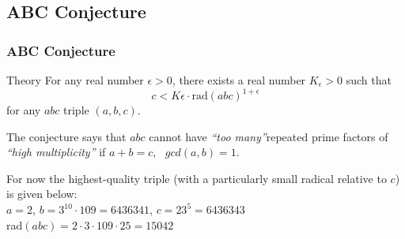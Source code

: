 \documentclass[9pt]{beamer}
\begin{document}
        \subsection{ABC Conjecture}
        \begin{frame}\label{abc}
            \frametitle{ABC Conjecture}
            \begin{block}{Theory}
                For any real number $\epsilon > 0$, there exists a real number $K_{\epsilon} > 0$ such that
                $$c < K\epsilon \cdot \text{rad}(abc)^{1+\epsilon}$$
                for any $abc$ triple $(a, b, c)$.
            \end{block}
            The conjecture says that $abc$ cannot have \textit{“too many”}repeated prime factors of \textit{“high multiplicity”} if $a + b = c,\text{ } gcd(a, b) = 1.$
            \pause
            \begin{example}
                For now the highest-quality triple (with a particularly small radical relative to $c$) is given below:\\\vspace{0.25cm}
                $a = 2$, $b = 3^{10} \cdot 109 = 6436341$, $c = 23^5 = 6436343$\\
                rad$(abc) = 2\cdot 3\cdot 109\cdot 25 =15042$
            \end{example}
        \end{frame}
        
\end{document}
